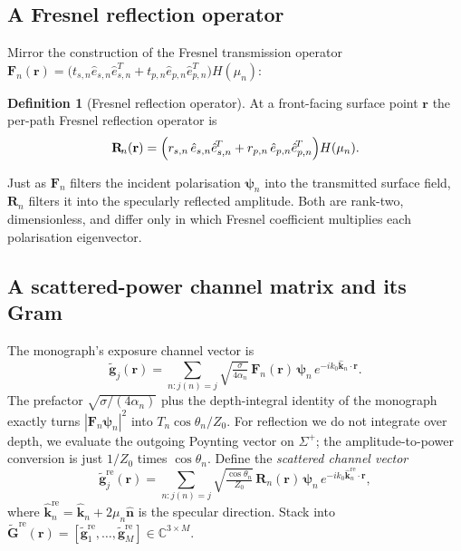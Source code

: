 \documentclass[11pt,a4paper]{article}
\theoremstyle{definition}
\newtheorem{definition}[definition]{Definition}
\newcommand{\khat}{\hat{\bm{k}}}
\newcommand{\nhat}{\hat{\bm{n}}}
\newcommand{\rr}{\mathbf{r}}
\newcommand{\Complex}{\mathbb{C}}
\newcommand{\Gtil}{\tilde{\mathbf{G}}}
\newcommand{\gtil}{\tilde{\mathbf{g}}}
\newcommand{\Fn}{\mathbf{F}_{\!n}}
\newcommand{\Rn}{\mathbf{R}_{\!n}}
\begin{document}
\subsection{A Fresnel reflection operator}

Mirror the construction of the Fresnel transmission operator
$\Fn(\rr)=\bigl(t_{s,n}\hat e_{s,n}\hat e_{s,n}^{\!T}
+t_{p,n}\hat e_{p,n}\hat e_{p,n}^{\!T}\bigr)H(\mu_n)$:

\begin{definition}[Fresnel reflection operator]\label{def:Rop}
At a front-facing surface point $\rr$ the per-path Fresnel
reflection operator is
\begin{equation}\label{eq:Rn}
  \Rn(\rr)=\Bigl(r_{s,n}\,\hat e_{s,n}\hat e_{s,n}^{\!T}
                +r_{p,n}\,\hat e_{p,n}\hat e_{p,n}^{\!T}\Bigr)H(\mu_n).
\end{equation}
\end{definition}

Just as $\Fn$ filters the incident polarisation $\bm\psi_n$ into the
transmitted surface field, $\Rn$ filters it into the specularly
reflected amplitude.  Both are rank-two, dimensionless, and differ
only in which Fresnel coefficient multiplies each polarisation
eigenvector.

\subsection{A scattered-power channel matrix and its Gram}

The monograph's exposure channel vector is
\begin{equation}
  \gtil_j(\rr)=\sum_{n:j(n)=j}\sqrt{\tfrac{\sigma}{4\alpha_n}}\,
  \Fn(\rr)\,\bm\psi_n\,e^{-ik_0\khat_n\cdot\rr}.
\end{equation}
The prefactor $\sqrt{\sigma/(4\alpha_n)}$ plus
the depth-integral identity of the monograph exactly turns
$|\Fn\bm\psi_n|^2$ into
$T_n\cos\theta_n/Z_0$.  For reflection we do not integrate over
depth, we evaluate the outgoing Poynting vector on $\Sigma^+$; the
amplitude-to-power conversion is just $1/Z_0$ times $\cos\theta_n$.
Define the \emph{scattered channel vector}
\begin{equation}\label{eq:gref}
  \gtil^{\mathrm{re}}_j(\rr)=\sum_{n:j(n)=j}
  \sqrt{\tfrac{\cos\theta_n}{Z_0}}\,\Rn(\rr)\,\bm\psi_n\,
  e^{-ik_0\khat_n^{\mathrm{re}}\cdot\rr},
\end{equation}
where $\khat_n^{\mathrm{re}}=\khat_n+2\mu_n\nhat$ is the specular
direction.  Stack into
$\Gtil^{\mathrm{re}}(\rr)=[\gtil^{\mathrm{re}}_1,\ldots,
\gtil^{\mathrm{re}}_M]\in\Complex^{3\times M}$.
\end{document}
